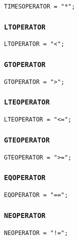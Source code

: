 \documentclass[12pt, a4paper]{article}
\begin{document}
\begin{verbatim}
TIMESOPERATOR = "*";
\end{verbatim}

\subsubsection{\texttt{LTOPERATOR}}

\begin{verbatim}
LTOPERATOR = "<";
\end{verbatim}

\subsubsection{\texttt{GTOPERATOR}}

\begin{verbatim}
GTOPERATOR = ">";
\end{verbatim}

\subsubsection{\texttt{LTEOPERATOR}}

\begin{verbatim}
LTEOPERATOR = "<=";
\end{verbatim}

\subsubsection{\texttt{GTEOPERATOR}}

\begin{verbatim}
GTEOPERATOR = ">=";
\end{verbatim}

\subsubsection{\texttt{EQOPERATOR}}

\begin{verbatim}
EQOPERATOR = "==";
\end{verbatim}

\subsubsection{\texttt{NEOPERATOR}}

\begin{verbatim}
NEOPERATOR = "!=";
\end{verbatim}
\end{document}
